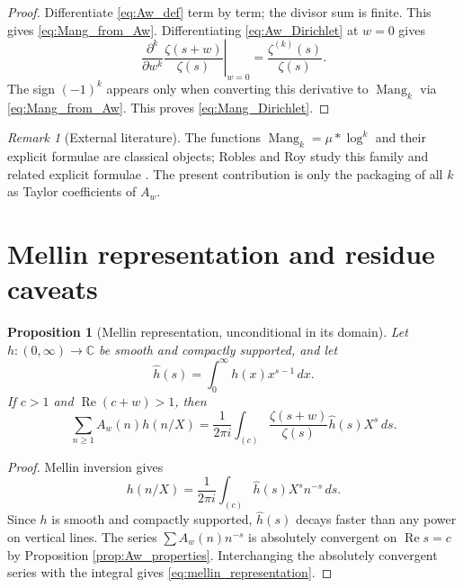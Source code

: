 \documentclass[11pt]{amsart}
\numberwithin{equation}{section}
\theoremstyle{plain}
\newtheorem{proposition}[theorem]{Proposition}
\theoremstyle{definition}
\theoremstyle{remark}
\newtheorem{remark}[theorem]{Remark}
\newcommand{\C}{\mathbb C}
\newcommand{\mob}{\mu}
\newcommand{\zetaR}{\zeta}
\newcommand{\Mang}{\operatorname{Mang}}
\begin{document}
\begin{proof}
Differentiate \eqref{eq:Aw_def} term by term; the divisor sum is finite.  This gives \eqref{eq:Mang_from_Aw}.  Differentiating \eqref{eq:Aw_Dirichlet} at \(w=0\) gives
\begin{equation}
\left.\frac{\partial^k}{\partial w^k}\frac{\zetaR(s+w)}{\zetaR(s)}\right|_{w=0}=\frac{\zetaR^{(k)}(s)}{\zetaR(s)}.
\label{eq:Aw_derivative_no_sign}
\end{equation}
The sign \((-1)^k\) appears only when converting this derivative to \(\Mang_k\) via \eqref{eq:Mang_from_Aw}.  This proves \eqref{eq:Mang_Dirichlet}.
\end{proof}

\begin{remark}[External literature]
\label{rem:robles_roy}
The functions \(\Mang_k=\mob*\log^k\) and their explicit formulae are classical objects; Robles and Roy study this family and related explicit formulae \cite{RoblesRoy2004}.  The present contribution is only the packaging of all \(k\) as Taylor coefficients of \(A_w\).
\end{remark}

\section{Mellin representation and residue caveats}
\label{sec:mellin_caveats}

\begin{proposition}[Mellin representation, unconditional in its domain]
\label{prop:mellin_representation}
Let \(h:(0,\infty)\to\C\) be smooth and compactly supported, and let
\begin{equation}
\widehat h(s)=\int_0^\infty h(x)x^{s-1}\,dx.
\label{eq:mellin_transform}
\end{equation}
If \(c>1\) and \(\operatorname{Re}(c+w)>1\), then
\begin{equation}
\sum_{n\ge1}A_w(n)h(n/X)=\frac1{2\pi i}\int_{(c)}\frac{\zetaR(s+w)}{\zetaR(s)}\widehat h(s)X^s\,ds.
\label{eq:mellin_representation}
\end{equation}
\end{proposition}

\begin{proof}
Mellin inversion gives
\begin{equation}
h(n/X)=\frac1{2\pi i}\int_{(c)}\widehat h(s)X^s n^{-s}\,ds.
\label{eq:mellin_inversion_step}
\end{equation}
Since \(h\) is smooth and compactly supported, \(\widehat h(s)\) decays faster than any power on vertical lines.  The series \(\sum A_w(n)n^{-s}\) is absolutely convergent on \(\operatorname{Re}s=c\) by Proposition \ref{prop:Aw_properties}.  Interchanging the absolutely convergent series with the integral gives \eqref{eq:mellin_representation}.
\end{proof}
\end{document}

